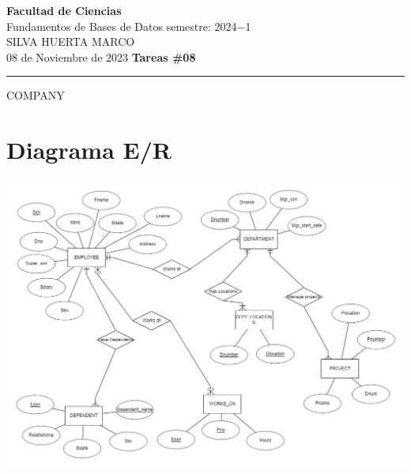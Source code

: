\documentclass[a4paper,12pt]{article}
\begin{document}

\thispagestyle{fancy} %
\noindent
\large\textbf{Facultad de Ciencias} \\
Fundamentos de Bases de Datos \hfill semestre: 2024$-$1   \\
\textsc{SILVA HUERTA MARCO}    \\
08 de Noviembre de 2023      \hfill \textbf{Tareas \#08}  \\
\noindent\rule{7.3in}{2.8pt}

\begin{center}
    \Large{COMPANY}
\end{center}


\section*{Diagrama E/R}
\begin{center}
    \includegraphics[scale = .5]{IMA/imageED.png}
\end{center}
\end{document}

